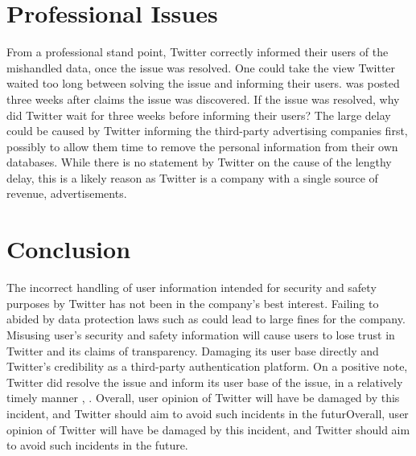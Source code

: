 \documentclass[a4paper, 11pt]{article}
\begin{document}
\section{Professional Issues}
From a professional stand point, Twitter correctly informed their users of the mishandled data, once the issue was resolved.
One could take the view Twitter waited too long between solving the issue and informing their users.
\textcite{support_twitter_2019} was posted three weeks after \textcite{support_personal_2019} claims the issue was discovered.
If the issue was resolved, why did Twitter wait for three weeks before informing their users?
The large delay could be caused by Twitter informing the third-party advertising companies first, possibly to allow them time to remove the personal information from their own databases.
While there is no statement by Twitter on the cause of the lengthy delay, this is a likely reason as Twitter is a company with a single source of revenue, advertisements.

\section{Conclusion}
The incorrect handling of user information intended for security and safety purposes by Twitter has not been in the company's best interest.
Failing to abided by data protection laws such as \textcite{noauthor_regulation_2016} could lead to large fines for the company.
Misusing user's security and safety information will cause users to lose trust in Twitter and its claims of transparency.
Damaging its user base directly and Twitter's credibility as a third-party authentication platform.
On a positive note, Twitter did resolve the issue and inform its user base of the issue, in a relatively timely manner \parencite{support_personal_2019}, \parencite{support_twitter_2019}.
Overall, user opinion of Twitter will have be damaged by this incident, and Twitter should aim to avoid such incidents in the futurOverall, user opinion of Twitter will have be damaged by this incident, and Twitter should aim to avoid such incidents in the future.

\printbibliography
\end{document}
